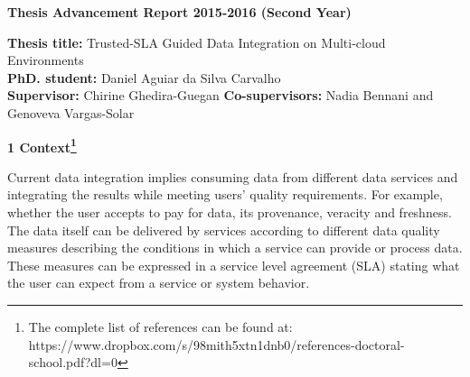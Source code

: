 \documentclass[11pt,a4paper,oneside]{report}
\author{Daniel Aguiar da Silva Carvalho}
\begin{document}
\sffamily
\begin{center}
\textbf{\large{Thesis Advancement Report 2015-2016 (Second Year)}}
\end{center}

\begin{flushleft}
\textbf{Thesis title:} Trusted-SLA Guided Data Integration on Multi-cloud Environments \\
\textbf{PhD. student:} Daniel Aguiar da Silva Carvalho \\
\textbf{Supervisor:} Chirine Ghedira-Guegan \textbf{Co-supervisors:} Nadia Bennani and Genoveva Vargas-Solar 
\end{flushleft}

\begin{flushleft}
\textbf{1 Context\footnote{The complete list of references can be found at: https://www.dropbox.com/s/98mith5xtn1dnb0/references-doctoral-school.pdf?dl=0}} \\
\end{flushleft} 


Current data integration implies consuming data from different data services and integrating the results while meeting users' quality requirements. For example, whether the user accepts to pay for data, its provenance, veracity and freshness. 
The data itself can be delivered by services according to different data quality measures describing the conditions in which a service can provide or process data. These measures can be expressed in a service level agreement (SLA) stating what the user can expect from a service or system behavior. %
\end{document}
